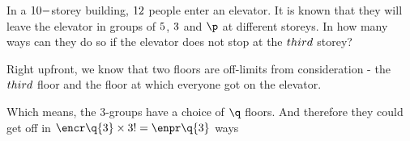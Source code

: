 

\EXPR[0]\p{(\vbtwo - (\vbthree + \vbfour))}
\SUBTRACT{}\q

\question[3] In a $10-$storey building, $12$ people enter an elevator. 
It is known that they will leave the elevator in groups of 
$5$, $3$ and $\p$ at different storeys. In how many ways can they do 
so if the elevator does not stop at the $third$ storey?


\watchout[-1cm]

\ifprintanswers
\fi 

\begin{solution}[\mcq]
  Right upfront, we know that two floors are off-limits from consideration - the $third$ floor
  and the floor at which everyone got on the elevator. 

  Which means, the 3-groups have a choice of $\q$ floors. And therefore they could get off 
  in $\encr\q{3}\times 3! = \enpr\q{3}$ ways
\end{solution}

